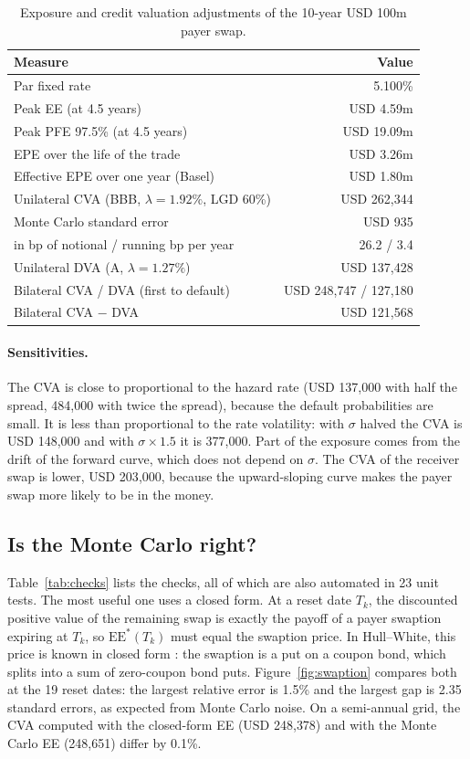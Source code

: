 \documentclass[11pt,a4paper]{article}
\begin{document}
\begin{table}[h]
\centering
\caption{Exposure and credit valuation adjustments of the 10-year USD 100m payer swap.}
\label{tab:cva}
\begin{tabular}{lr}
\toprule
Measure & Value \\
\midrule
Par fixed rate & 5.100\% \\
Peak EE (at 4.5 years) & USD 4.59m \\
Peak PFE 97.5\% (at 4.5 years) & USD 19.09m \\
EPE over the life of the trade & USD 3.26m \\
Effective EPE over one year (Basel) & USD 1.80m \\
\midrule
Unilateral CVA (BBB, $\lambda=1.92\%$, LGD 60\%) & USD 262{,}344 \\
\quad Monte Carlo standard error & USD 935 \\
\quad in bp of notional / running bp per year & 26.2 / 3.4 \\
Unilateral DVA (A, $\lambda=1.27\%$) & USD 137{,}428 \\
Bilateral CVA / DVA (first to default) & USD 248{,}747 / 127{,}180 \\
Bilateral CVA $-$ DVA & USD 121{,}568 \\
\bottomrule
\end{tabular}
\end{table}

\paragraph{Sensitivities.} The CVA is close to proportional to the hazard rate (USD 137{,}000 with half the spread, 484{,}000 with twice the spread), because the default probabilities are small. It is less than proportional to the rate volatility: with $\sigma$ halved the CVA is USD 148{,}000 and with $\sigma \times 1.5$ it is 377{,}000. Part of the exposure comes from the drift of the forward curve, which does not depend on $\sigma$. The CVA of the receiver swap is lower, USD 203{,}000, because the upward-sloping curve makes the payer swap more likely to be in the money.

\subsection{Is the Monte Carlo right?}

Table~\ref{tab:checks} lists the checks, all of which are also automated in 23 unit tests. The most useful one uses a closed form. At a reset date $T_k$, the discounted positive value of the remaining swap is exactly the payoff of a payer swaption expiring at $T_k$, so $\text{EE}^*(T_k)$ must equal the swaption price. In Hull--White, this price is known in closed form \citep{jamshidian1989}: the swaption is a put on a coupon bond, which splits into a sum of zero-coupon bond puts. Figure~\ref{fig:swaption} compares both at the 19 reset dates: the largest relative error is 1.5\% and the largest gap is 2.35 standard errors, as expected from Monte Carlo noise. On a semi-annual grid, the CVA computed with the closed-form EE (USD 248{,}378) and with the Monte Carlo EE (248{,}651) differ by 0.1\%.
\end{document}
